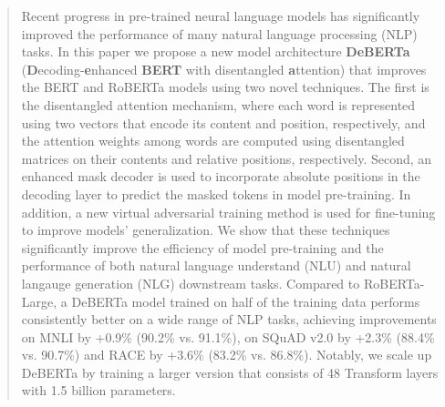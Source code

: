 \begin{abstract}
Recent progress in pre-trained neural language models has significantly improved the performance of many natural language processing (NLP) tasks. In this paper we propose a new model architecture \textbf{DeBERTa}
(\textbf{D}ecoding-\textbf{e}nhanced \textbf{BERT} with disentangled \textbf{a}ttention) 
that improves the BERT and RoBERTa models using two novel techniques.
The first is the disentangled attention mechanism, where each word is represented using two vectors that encode its content and position, respectively, and the attention weights among words are computed using disentangled matrices on their contents and relative positions, respectively.
Second, 
an enhanced mask decoder is used to incorporate absolute positions in the decoding layer to predict the masked tokens in model pre-training.
In addition, a new virtual adversarial training method is used for fine-tuning to improve models' generalization.  
We show that these techniques significantly improve the efficiency of model pre-training and the performance of both natural language understand (NLU) and natural langauge generation (NLG) downstream tasks. 
Compared to RoBERTa-Large, a DeBERTa model 
trained on half of the training data
performs consistently better on a wide range of NLP tasks, 
achieving improvements on MNLI by +0.9\% (90.2\% vs. 91.1\%), on SQuAD v2.0 by +2.3\% (88.4\% vs. 90.7\%) and RACE by +3.6\% (83.2\% vs. 86.8\%). 
Notably, we scale up DeBERTa by training a larger version that consists of 48 Transform layers with 1.5 billion parameters. 

\end{abstract}
